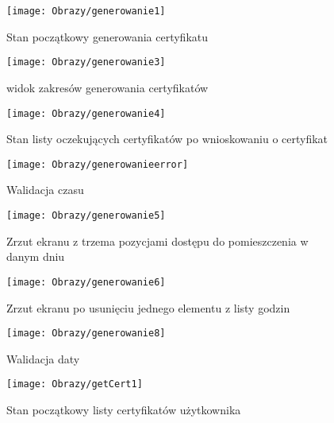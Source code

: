 \begin{enumerate*}
\begin{figure}[ht!]
		\begin{minipage}{0.2\textwidth}
			\texttt{[image: Obrazy/generowanie1]}
			\caption{Stan początkowy generowania certyfikatu }
			\label{rys:generowanie1}
		\end{minipage}
	
		
		\begin{minipage}{0.2\textwidth}
			\texttt{[image: Obrazy/generowanie3]}
			\caption{widok zakresów generowania certyfikatów}
			\label{rys:generowanie2}
		\end{minipage}
		\begin{minipage}{0.2\textwidth}
			\texttt{[image: Obrazy/generowanie4]}
			\caption{Stan listy oczekujących certyfikatów po wnioskowaniu o certyfikat}
			\label{rys:generowanie3}
		\end{minipage}
	\end{figure}
	\begin{figure}[ht!]	
		\begin{minipage}{0.2\textwidth}
		\texttt{[image: Obrazy/generowanieerror]}
		\caption{Walidacja czasu }
		\label{rys:generowanie4}
	\end{minipage}
	
		\begin{minipage}{0.2\textwidth}
		\texttt{[image: Obrazy/generowanie5]}
		\caption{Zrzut ekranu z trzema pozycjami dostępu do pomieszczenia w danym dniu }
		\label{rys:generowanie5}
	\end{minipage}
	

	\begin{minipage}{0.2\textwidth}
		\texttt{[image: Obrazy/generowanie6]}
		\caption{Zrzut ekranu po usunięciu jednego elementu z listy godzin}
		\label{rys:generowanie6}
	\end{minipage}
	
	\begin{minipage}{0.2\textwidth}
		\texttt{[image: Obrazy/generowanie8]}
		\caption{Walidacja daty}
		\label{rys:generowanie7}
	\end{minipage}

\end{figure}
	
	

	
		\begin{figure}[ht!]
		
		\begin{minipage}{0.2\textwidth}
			\texttt{[image: Obrazy/getCert1]}
			\caption{Stan początkowy listy certyfikatów użytkownika }
			\label{rys:getCert1}
		\end{minipage}
		

\end{figure}
\end{enumerate*}
